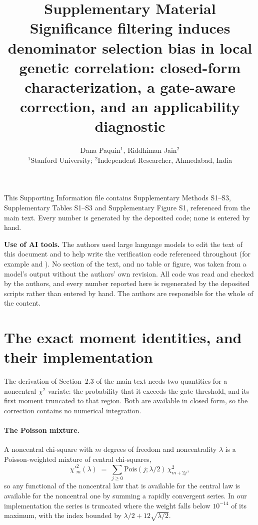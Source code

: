\documentclass[11pt,a4paper]{article}
\title{Supplementary Material\\[4pt]
\large Significance filtering induces denominator selection bias in local genetic
correlation: closed-form characterization, a gate-aware correction, and an applicability
diagnostic}
\author{Dana Paquin$^1$, Riddhiman Jain$^2$ \\[0.5em]
{\small $^1$Stanford University; $^2$Independent Researcher, Ahmedabad, India}}
\date{}
\begin{document}
\maketitle

\noindent This Supporting Information file contains Supplementary Methods S1--S3, Supplementary Tables
S1--S3 and Supplementary Figure S1, referenced from the main text. Every number is
generated by the deposited code; none is entered by hand.

\medskip
\noindent\textbf{Use of AI tools.} The authors used large language models to edit the text
of this document and to help write the verification code referenced throughout (for
example  and ).
No section of the text, and no table or figure, was taken from a model's output without
the authors' own revision. All code was read and checked by the authors, and every number
reported here is regenerated by the deposited scripts rather than entered by hand. The
authors are responsible for the whole of the content.

\tableofcontents

\section{The exact moment identities, and their implementation}

The derivation of Section~2.3 of the main text needs two quantities for a noncentral
$\chi^2$ variate: the probability that it exceeds the gate threshold, and its first moment
truncated to that region. Both are available in closed form, so the correction contains no
numerical integration.

\paragraph{The Poisson mixture.} A noncentral chi-square with $m$ degrees of freedom and
noncentrality $\lambda$ is a Poisson-weighted mixture of central chi-squares,
\begin{equation}
\chi'^2_m(\lambda) \;=\; \sum_{j\ge0} \mathrm{Pois}(j;\lambda/2)\,\chi^2_{m+2j},
\end{equation}
so any functional of the noncentral law that is available for the central law is available
for the noncentral one by summing a rapidly convergent series. In our implementation the
series is truncated where the weight falls below $10^{-14}$ of its maximum, with the index
bounded by $\lambda/2 + 12\sqrt{\lambda/2}$.
\end{document}
